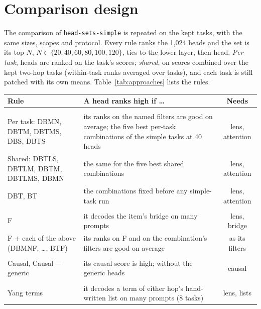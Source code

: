 \documentclass[10pt,a4paper]{article}
\begin{document}
\section{Comparison design}\label{sec:approaches}

The comparison of \texttt{head-sets-simple} is repeated on the kept tasks, with the same sizes, scopes and protocol. Every rule ranks the 1{,}024 heads and the set is its top $N$, $N\in\{20,40,60,80,100,120\}$, ties to the lower layer, then head. \emph{Per task}, heads are ranked on the task's scores; \emph{shared}, on scores combined over the kept two-hop tasks (within-task ranks averaged over tasks), and each task is still patched with its own means. Table~\ref{tab:approaches} lists the rules.

\begin{table}[tbp]
\centering\small
\begin{tabularx}{\textwidth}{@{}>{\raggedright\arraybackslash}p{4.2cm}Lc@{}}
\toprule
Rule & A head ranks high if \dots & Needs \\
\midrule
{} \\
Per task: DBMN, DBTM, DBTMS, DBS, DBTS & its ranks on the named filters are good on average; the five best per-task combinations of the simple tasks at 40 heads & lens, attention \\
Shared: DBTLS, DBTLM, DBTM, DBTLMS, DBMN & the same for the five best shared combinations & lens, attention \\
DBT, BT & the combinations fixed before any simple-task run & lens, attention \\
\midrule
{} \\
F & it decodes the item's bridge on many prompts & lens, bridge \\
F + each of the above (DBMNF, \dots, BTF) & its ranks on F and on the combination's filters are good on average & as its filters \\
\midrule
{} \\
Causal, Causal $-$ generic & its causal score is high; without the generic heads & causal \\
\midrule
{} \\
Yang terms & it decodes a term of either hop's hand-written list on many prompts (8 tasks) & lens, lists \\

\end{tabularx}
\end{table}
\end{document}
